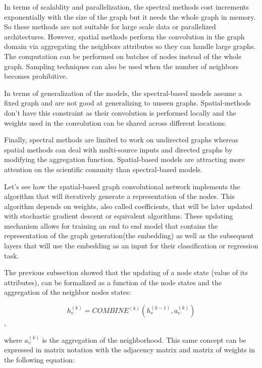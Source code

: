In terms of scalablity and parallelization, the spectral methods  cost increments exponentially with the size of the graph but it needs the whole graph in memory. So these methods are not suitable for large scale data or parallelized architectures. However, spatial methods perform the convolution in the graph domain via aggregating the neighbors attributes so they can handle large graphs. The computation can be performed on batches of nodes instead of the whole graph. Sampling techniques can also be used when the number of neighbors becomes prohibitive.

In terms of generalization of the models, the spectral-based models assume a fixed graph and are not good at generalizing to unseen graphs. Spatial-methods don't have this constraint as their convolution is performed locally and the weights used in the convolution can be shared across different locations.

Finally, spectral methods are limited to work on undirected graphs whereas spatial methods can deal with multi-source inputs and directed graphs by modifying the aggregation function. Spatial-based models are attracting more attention on the scientific comunity than spectral-based models.




Let's see how the spatial-based graph convolutional network implements the algorithm that will iteratively generate a representation of the nodes. This algorithm depends on weights, also called coefficients, that will be later updated with stochastic gradient descent or equivalent algorithms. These updating mechanism allows for training an end to end model that contains the representation of the graph generation(the embedding) as well as the subsequent layers that will use the embedding as an input for their classification or regression task.

The previous subsection showed that the updating of a node state (value of its attributes), can be formalized as a function of the node states and the aggregation of the neighbor nodes states:

 $$ h_v^{(k)} = COMBINE^{(k)}(h_v^{(k-1)}, a_v^{(k)})$$,

where $a_v^{(k)}$ is the aggregation of the neighborhood. This same concept can be expressed in matrix notation with the adjacency matrix and matrix of weights in the following equation:


